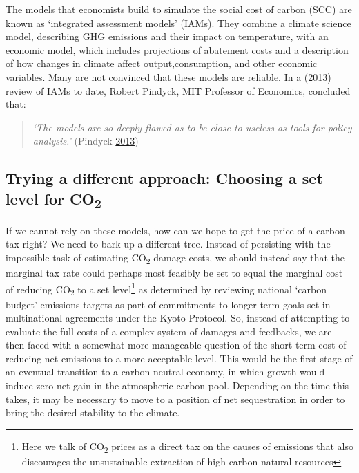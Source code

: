 \documentclass[]{tufte-handout}
\begin{document}
The models that economists build to simulate the social cost of carbon
(SCC) are known as `integrated assessment models' (IAMs). They combine a
climate science model, describing GHG emissions and their impact on
temperature, with an economic model, which includes projections of
abatement costs and a description of how changes in climate affect
output,consumption, and other economic variables. Many are not convinced
that these models are reliable. In a (2013) review of IAMs to date,
Robert Pindyck, MIT Professor of Economics, concluded that:

\begin{quote}
\emph{`The models are so deeply flawed as to be close to useless as
tools for policy analysis.'} (Pindyck
\protect\hyperlink{ref-Pindyck2013}{2013})
\end{quote}

\hypertarget{trying-a-different-approach-choosing-a-set-level-for-co2}{%
\subsection{\texorpdfstring{Trying a different approach: Choosing a set
level for
CO\textsubscript{2}}{Trying a different approach: Choosing a set level for CO2}}\label{trying-a-different-approach-choosing-a-set-level-for-co2}}

If we cannot rely on these models, how can we hope to get the price of a
carbon tax right? We need to bark up a different tree. Instead of
persisting with the impossible task of estimating CO\textsubscript{2}
damage costs, we should instead say that the marginal tax rate could
perhaps most feasibly be set to equal the marginal cost of reducing
CO\textsubscript{2} to a set level\footnote{Here we talk of
  CO\textsubscript{2} prices as a direct tax on the causes of emissions
  that also discourages the unsustainable extraction of high-carbon
  natural resources} as determined by reviewing national `carbon budget'
emissions targets as part of commitments to longer-term goals set in
multinational agreements under the Kyoto Protocol. So, instead of
attempting to evaluate the full costs of a complex system of damages and
feedbacks, we are then faced with a somewhat more manageable question of
the short-term cost of reducing net emissions to a more acceptable
level. This would be the first stage of an eventual transition to a
carbon-neutral economy, in which growth would induce zero net gain in
the atmospheric carbon pool. Depending on the time this takes, it may be
necessary to move to a position of net sequestration in order to bring
the desired stability to the climate.
\end{document}
